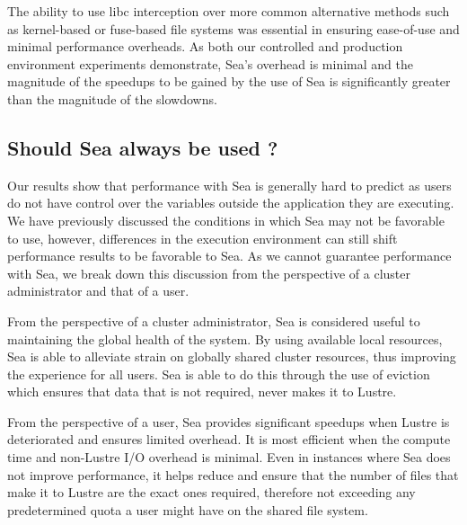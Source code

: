     The ability to use libc interception over more common alternative methods
    such as kernel-based or fuse-based file systems was essential in ensuring
    ease-of-use and minimal performance overheads. As both our controlled and production
    environment experiments demonstrate, Sea's overhead is minimal and the magnitude of the
    speedups to be gained by the use of Sea is significantly greater than the magnitude of the
    slowdowns.
    
    \subsection{Should Sea always be used ?}
    
    Our results show that performance with Sea is generally hard to predict as users do not have control
    over the variables outside the application they are executing. We have previously discussed the
    conditions in which Sea may not be favorable to use, however, differences in the execution environment
    can still shift performance results to be favorable to Sea. As we cannot guarantee performance with
    Sea, we break down this discussion from the perspective of a cluster administrator and that of a user.

    From the perspective of a cluster administrator, Sea is considered useful to
    maintaining the global health of the system. By using available local
    resources, Sea is able to alleviate strain on globally shared cluster
    resources, thus improving the experience for all users. Sea is able to do
    this through the use of eviction which ensures that data that is not
    required, never makes it to Lustre.


    From the perspective of a user, Sea provides significant speedups when
    Lustre is deteriorated and ensures limited overhead. It is most efficient
    when the compute time and non-Lustre I/O overhead is minimal. Even in
    instances where Sea does not improve performance, it helps reduce and ensure
    that the number of files that make it to Lustre are the exact ones required,
    therefore not exceeding any predetermined quota a user might have on the
    shared file system. 
    
    
    
    
    
    
